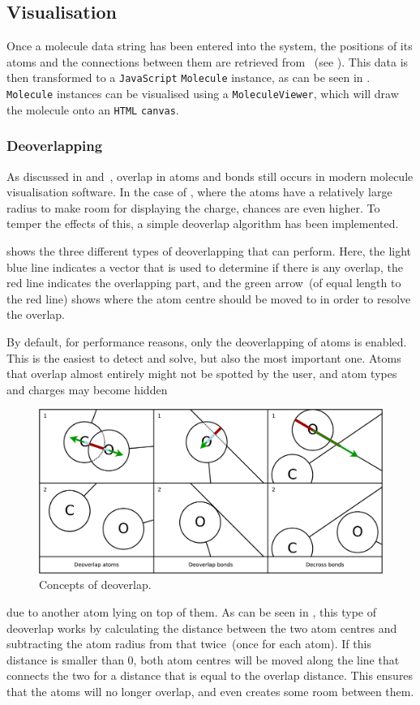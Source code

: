 \subsection{Visualisation}
Once a molecule data string has been entered into the system, the positions of its atoms and the connections between them are retrieved from \oapoc~(see ). This data is then transformed to a \verb|JavaScript| \verb|Molecule| instance, as can be seen in . \verb|Molecule| instances can be visualised using a \verb|MoleculeViewer|, which will draw the molecule onto an \verb|HTML| \verb|canvas|.

\subsubsection{Deoverlapping}
As discussed in  and~\cite{clark2006structure}, overlap in atoms and bonds still occurs in modern molecule visualisation software. In the case of \oframp, where the atoms have a relatively large radius to make room for displaying the charge, chances are even higher. To temper the effects of this, a simple deoverlap algorithm has been implemented.

 shows the three different types of deoverlapping that \oframp{} can perform. Here, the light blue line indicates a vector that is used to determine if there is any overlap, the red line indicates the overlapping part, and the green arrow~(of equal length to the red line) shows where the atom centre should be moved to in order to resolve the overlap.

By default, for performance reasons, only the deoverlapping of atoms is enabled. This is the easiest to detect and solve, but also the most important one. Atoms that overlap almost entirely might not be spotted by the user, and atom types and charges may become hidden 
\begin{figure}
\center
\includegraphics[width=\textwidth]{img/deoverlap.pdf}
\caption{Concepts of deoverlap.}
\end{figure}due to another atom lying on top of them. As can be seen in , this type of deoverlap works by calculating the distance between the two atom centres and subtracting the atom radius from that twice~(once for each atom). If this distance is smaller than $0$, both atom centres will be moved along the line that connects the two for a distance that is equal to the overlap distance. This ensures that the atoms will no longer overlap, and even creates some room between them.

